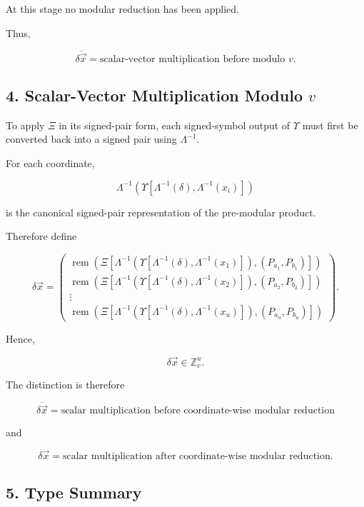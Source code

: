 \documentclass[12pt]{article}
\begin{document}
At this stage no modular reduction has been applied.

Thus,

\[
\boxed{
\overline{\delta\vec{x}}
=
\text{scalar-vector multiplication before modulo }v.
}
\]

\subsection*{4. Scalar-Vector Multiplication Modulo \(v\)}

To apply \(\Xi\) in its signed-pair form, each signed-symbol output of \(\Upsilon\) must first be converted back into a signed pair using \(\Lambda^{-1}\).

For each coordinate,

\[
\Lambda^{-1}
\left(
\Upsilon
\left[
\Lambda^{-1}(\delta),
\Lambda^{-1}(x_i)
\right]
\right)
\]

is the canonical signed-pair representation of the pre-modular product.

Therefore define

\[
\boxed{
\delta\vec{x}
=
\begin{pmatrix}
\operatorname{rem}
\left(
\Xi
\left[
\Lambda^{-1}
\left(
\Upsilon
\left[
\Lambda^{-1}(\delta),
\Lambda^{-1}(x_1)
\right]
\right),
(P_{a_1},P_{b_1})
\right]
\right)
\\[14pt]
\operatorname{rem}
\left(
\Xi
\left[
\Lambda^{-1}
\left(
\Upsilon
\left[
\Lambda^{-1}(\delta),
\Lambda^{-1}(x_2)
\right]
\right),
(P_{a_2},P_{b_2})
\right]
\right)
\\
\vdots
\\
\operatorname{rem}
\left(
\Xi
\left[
\Lambda^{-1}
\left(
\Upsilon
\left[
\Lambda^{-1}(\delta),
\Lambda^{-1}(x_u)
\right]
\right),
(P_{a_u},P_{b_u})
\right]
\right)
\end{pmatrix}.
}
\]

Hence,

\[
\boxed{
\delta\vec{x}\in\mathbb Z_v^u.
}
\]

The distinction is therefore

\[
\boxed{
\overline{\delta\vec{x}}
=
\text{scalar multiplication before coordinate-wise modular reduction}
}
\]

and

\[
\boxed{
\delta\vec{x}
=
\text{scalar multiplication after coordinate-wise modular reduction}.
}
\]

\subsection*{5. Type Summary}
\end{document}
